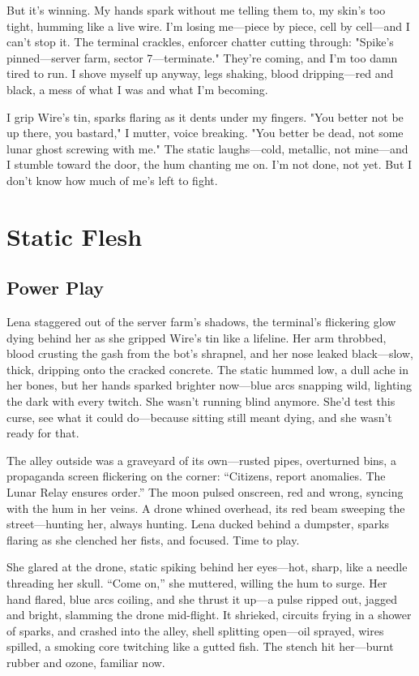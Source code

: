 \documentclass[12pt]{book}
\begin{document}
But it's winning. My hands spark without me telling them to, my skin's too tight, humming like a live wire. I'm losing me---piece by piece, cell by cell---and I can't stop it. The terminal crackles, enforcer chatter cutting through: "Spike's pinned---server farm, sector 7---terminate." They're coming, and I'm too damn tired to run. I shove myself up anyway, legs shaking, blood dripping---red and black, a mess of what I was and what I'm becoming.

I grip Wire's tin, sparks flaring as it dents under my fingers. "You better not be up there, you bastard," I mutter, voice breaking. "You better be dead, not some lunar ghost screwing with me." The static laughs---cold, metallic, not mine---and I stumble toward the door, the hum chanting me on. I'm not done, not yet. But I don't know how much of me's left to fight.

\chapter{Static Flesh}
\section{Power Play}

Lena staggered out of the server farm’s shadows, the terminal’s flickering glow dying behind her as she gripped Wire’s tin like a lifeline. Her arm throbbed, blood crusting the gash from the bot’s shrapnel, and her nose leaked black---slow, thick, dripping onto the cracked concrete. The static hummed low, a dull ache in her bones, but her hands sparked brighter now---blue arcs snapping wild, lighting the dark with every twitch. She wasn’t running blind anymore. She’d test this curse, see what it could do---because sitting still meant dying, and she wasn’t ready for that.

The alley outside was a graveyard of its own---rusted pipes, overturned bins, a propaganda screen flickering on the corner: “Citizens, report anomalies. The Lunar Relay ensures order.” The moon pulsed onscreen, red and wrong, syncing with the hum in her veins. A drone whined overhead, its red beam sweeping the street---hunting her, always hunting. Lena ducked behind a dumpster, sparks flaring as she clenched her fists, and focused. Time to play.

She glared at the drone, static spiking behind her eyes---hot, sharp, like a needle threading her skull. “Come on,” she muttered, willing the hum to surge. Her hand flared, blue arcs coiling, and she thrust it up---a pulse ripped out, jagged and bright, slamming the drone mid-flight. It shrieked, circuits frying in a shower of sparks, and crashed into the alley, shell splitting open---oil sprayed, wires spilled, a smoking core twitching like a gutted fish. The stench hit her---burnt rubber and ozone, familiar now.
\end{document}
